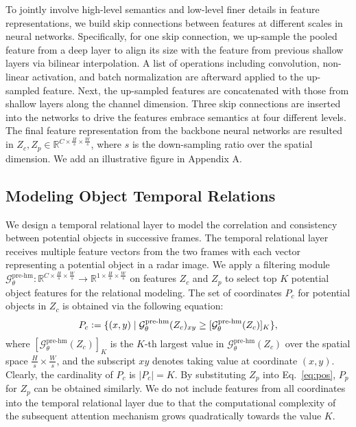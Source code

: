 \documentclass[10pt,twocolumn,letterpaper]{article}
\newcommand{\RR}{\mathbb{R}}
\newcommand{\defeq}{\vcentcolon=}
\begin{document}
To jointly involve high-level semantics and low-level finer details in feature representations, we build skip connections between features at different scales in neural networks. Specifically, for one skip connection, we up-sample the pooled feature from a deep layer to align its size with the feature from previous shallow layers via bilinear interpolation. A list of operations including convolution, non-linear activation, and batch normalization are afterward applied to the up-sampled feature. Next, the up-sampled features are concatenated with those from shallow layers along the channel dimension. Three skip connections are inserted into the networks to drive the features embrace semantics at four different levels. The final feature representation from the backbone neural networks are resulted in $Z_{c}, Z_{p}\in\RR^{C\times \frac{H}{s}\times \frac{W}{s}}$, where $s$ is the down-sampling ratio over the spatial dimension. We add an illustrative figure in Appendix A.



\subsection{Modeling Object Temporal Relations}

We design a temporal relational layer to model the correlation and consistency between potential objects in successive frames. The temporal relational layer receives multiple feature vectors from the two frames with each vector representing a potential object in a radar image. We apply a filtering module $\mathcal{G}_\theta^{\text{pre-hm}}: \RR^{C\times \frac{H}{s}\times \frac{W}{s}} \rightarrow \RR^{1\times \frac{H}{s}\times \frac{W}{s}}$ on features $Z_c$ and $Z_p$ to select top $K$ potential object features for the relational modeling. The set of coordinates $P_c$ for potential objects in $Z_c$ is obtained via the following equation:
\begin{equation}\label{eq:pos}
    P_c \defeq \{ (x, y)\mid\mathcal{G}_\theta^{\text{pre-hm}}(Z_{c})_{xy} \geq [\mathcal{G}_\theta^{\text{pre-hm}}(Z_{c})]_K\},
\end{equation}
where $[\mathcal{G}_\theta^{\text{pre-hm}}(Z_{c})]_K$ is the $K$-th largest value in $\mathcal{G}_\theta^{\text{pre-hm}}(Z_{c})$ over the spatial space $\frac{H}{s}\times \frac{W}{s}$, and the subscript $xy$ denotes taking value at coordinate $(x,y)$. Clearly, the cardinality of $P_c$ is $|P_c| = K$. By substituting $Z_p$ into Eq.~\eqref{eq:pos}, $P_p$ for $Z_p$ can be obtained similarly. We do not include features from all coordinates into the temporal relational layer due to that the computational complexity of the subsequent attention mechanism grows quadratically towards the value $K$.
\end{document}
